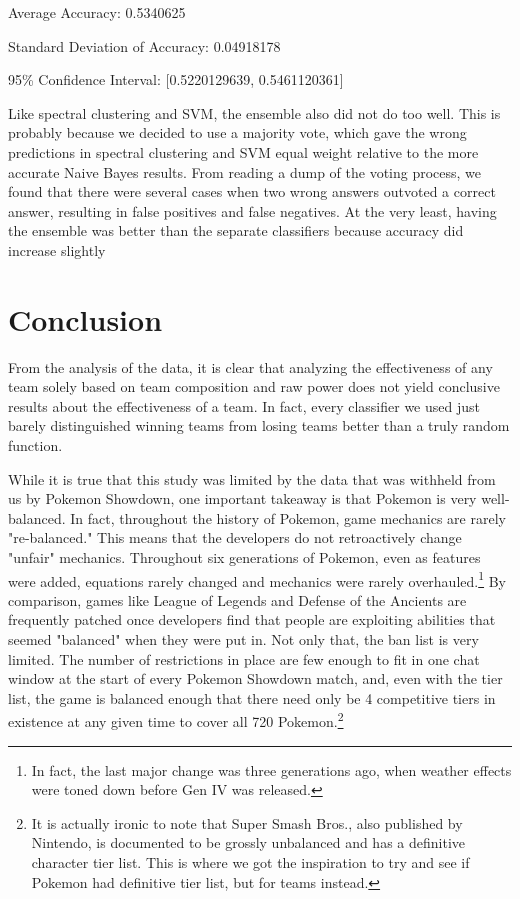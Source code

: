 \documentclass{acm_proc_article-sp}
\begin{document}
Average Accuracy: 0.5340625

Standard Deviation of Accuracy: 0.04918178

95\% Confidence Interval: [0.5220129639, 0.5461120361]

Like spectral clustering and SVM, the ensemble also did not do too well. This is probably because we decided to use a majority vote, which gave the wrong predictions in spectral clustering and SVM equal weight relative to the more accurate Naive Bayes results. From reading a dump of the voting process, we found that there were several cases when two wrong answers outvoted a correct answer, resulting in false positives and false negatives. At the very least, having the ensemble was better than the separate classifiers because accuracy did increase slightly

\section{Conclusion}

From the analysis of the data, it is clear that analyzing the effectiveness of any team solely based on team composition and raw power does not yield conclusive results about the effectiveness of a team. In fact, every classifier we used just barely distinguished winning teams from losing teams better than a truly random function.

While it is true that this study was limited by the data that was withheld from us by Pokemon Showdown, one important takeaway is that Pokemon is very well-balanced. In fact, throughout the history of Pokemon, game mechanics are rarely "re-balanced." This means that the developers do not retroactively change "unfair" mechanics. Throughout six generations of Pokemon, even as features were added, equations rarely changed and mechanics were rarely overhauled.\footnote{In fact, the last major change was three generations ago, when weather effects were toned down before Gen IV was released.} By comparison, games like League of Legends and Defense of the Ancients are frequently patched once developers find that people are exploiting abilities that seemed "balanced" when they were put in. Not only that, the ban list is very limited. The number of restrictions in place are few enough to fit in one chat window at the start of every Pokemon Showdown match, and, even with the tier list, the game is balanced enough that there need only be 4 competitive tiers in existence at any given time to cover all 720 Pokemon.\footnote{It is actually ironic to note that Super Smash Bros., also published by Nintendo, is documented to be grossly unbalanced and has a definitive character tier list. This is where we got the inspiration to try and see if Pokemon had definitive tier list, but for teams instead.}
\end{document}
